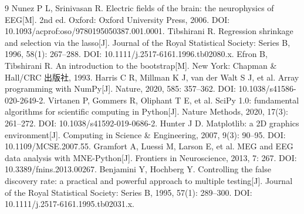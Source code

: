 \documentclass[bwprint]{gmcmthesis}
\begin{document}
\begin{thebibliography}{9}
 Nunez P L, Srinivasan R. Electric fields of the brain: the neurophysics of EEG[M]. 2nd ed. Oxford: Oxford University Press, 2006. DOI: 10.1093/acprof:oso/9780195050387.001.0001.
 Tibshirani R. Regression shrinkage and selection via the lasso[J]. Journal of the Royal Statistical Society: Series B, 1996, 58(1): 267--288. DOI: 10.1111/j.2517-6161.1996.tb02080.x.
 Efron B, Tibshirani R. An introduction to the bootstrap[M]. New York: Chapman \& Hall/CRC 出版社, 1993.
 Harris C R, Millman K J, van der Walt S J, et al. Array programming with NumPy[J]. Nature, 2020, 585: 357--362. DOI: 10.1038/s41586-020-2649-2.
 Virtanen P, Gommers R, Oliphant T E, et al. SciPy 1.0: fundamental algorithms for scientific computing in Python[J]. Nature Methods, 2020, 17(3): 261--272. DOI: 10.1038/s41592-019-0686-2.
 Hunter J D. Matplotlib: a 2D graphics environment[J]. Computing in Science \& Engineering, 2007, 9(3): 90--95. DOI: 10.1109/MCSE.2007.55.
 Gramfort A, Luessi M, Larson E, et al. MEG and EEG data analysis with MNE-Python[J]. Frontiers in Neuroscience, 2013, 7: 267. DOI: 10.3389/fnins.2013.00267.
 Benjamini Y, Hochberg Y. Controlling the false discovery rate: a practical and powerful approach to multiple testing[J]. Journal of the Royal Statistical Society: Series B, 1995, 57(1): 289--300. DOI: 10.1111/j.2517-6161.1995.tb02031.x.
\end{thebibliography}
\label{body:end}
\end{document}
